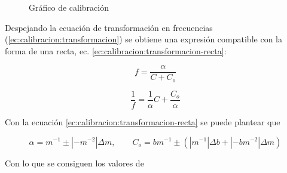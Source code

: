 \begin{figure}[H]
    \centering
    
    \caption{Gráfico de calibración}
    \label{fig:calibracion:rectas}
\end{figure}

Despejando la ecuación de transformación en frecuencias
(\ref{ec:calibracion:transformacion}) se obtiene una expresión compatible con
la forma de una recta, ec. \ref{ec:calibracion:transformacion-recta}:

\begin{equation}
    \label{ec:calibracion:transformacion}
    f = \frac{\alpha}{C + C_o}
\end{equation}

\begin{equation}
    \label{ec:calibracion:transformacion-recta}
    \frac{1}{f} = \frac{1}{\alpha} C + \frac{C_o}{\alpha}
\end{equation}

Con la ecuación \ref{ec:calibracion:transformacion-recta} se puede plantear que

\[
    \alpha = m^{-1} \pm \left| -m^{-2} \right| \Delta m,
    \quad\quad
    C_o = bm^{-1} \pm \left( \left| m^{-1} \right| \Delta b +
        \left| -bm^{-2} \right| \Delta m \right)
\]

Con lo que se consiguen los valores de 
